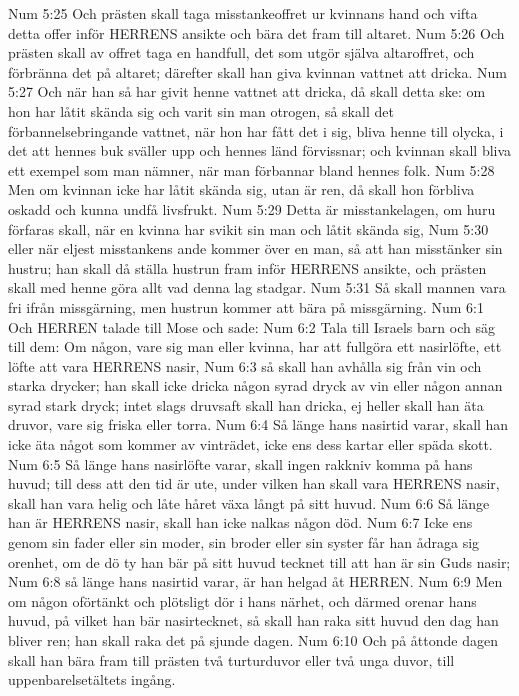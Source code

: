 Num 5:25  Och prästen skall taga misstankeoffret ur kvinnans hand och vifta detta offer inför HERRENS ansikte och bära det fram till altaret.
Num 5:26  Och prästen skall av offret taga en handfull, det som utgör själva altaroffret, och förbränna det på altaret; därefter skall han giva kvinnan vattnet att dricka.
Num 5:27  Och när han så har givit henne vattnet att dricka, då skall detta ske: om hon har låtit skända sig och varit sin man otrogen, så skall det förbannelsebringande vattnet, när hon har fått det i sig, bliva henne till olycka, i det att hennes buk sväller upp och hennes länd förvissnar; och kvinnan skall bliva ett exempel som man nämner, när man förbannar bland hennes folk.
Num 5:28  Men om kvinnan icke har låtit skända sig, utan är ren, då skall hon förbliva oskadd och kunna undfå livsfrukt.
Num 5:29  Detta är misstankelagen, om huru förfaras skall, när en kvinna har svikit sin man och låtit skända sig,
Num 5:30  eller när eljest misstankens ande kommer över en man, så att han misstänker sin hustru; han skall då ställa hustrun fram inför HERRENS ansikte, och prästen skall med henne göra allt vad denna lag stadgar.
Num 5:31  Så skall mannen vara fri ifrån missgärning, men hustrun kommer att bära på missgärning.
Num 6:1  Och HERREN talade till Mose och sade:
Num 6:2  Tala till Israels barn och säg till dem: Om någon, vare sig man eller kvinna, har att fullgöra ett nasirlöfte, ett löfte att vara HERRENS nasir,
Num 6:3  så skall han avhålla sig från vin och starka drycker; han skall icke dricka någon syrad dryck av vin eller någon annan syrad stark dryck; intet slags druvsaft skall han dricka, ej heller skall han äta druvor, vare sig friska eller torra.
Num 6:4  Så länge hans nasirtid varar, skall han icke äta något som kommer av vinträdet, icke ens dess kartar eller späda skott.
Num 6:5  Så länge hans nasirlöfte varar, skall ingen rakkniv komma på hans huvud; till dess att den tid är ute, under vilken han skall vara HERRENS nasir, skall han vara helig och låte håret växa långt på sitt huvud.
Num 6:6  Så länge han är HERRENS nasir, skall han icke nalkas någon död.
Num 6:7  Icke ens genom sin fader eller sin moder, sin broder eller sin syster får han ådraga sig orenhet, om de dö ty han bär på sitt huvud tecknet till att han är sin Guds nasir;
Num 6:8  så länge hans nasirtid varar, är han helgad åt HERREN.
Num 6:9  Men om någon oförtänkt och plötsligt dör i hans närhet, och därmed orenar hans huvud, på vilket han bär nasirtecknet, så skall han raka sitt huvud den dag han bliver ren; han skall raka det på sjunde dagen.
Num 6:10  Och på åttonde dagen skall han bära fram till prästen två turturduvor eller två unga duvor, till uppenbarelsetältets ingång.
